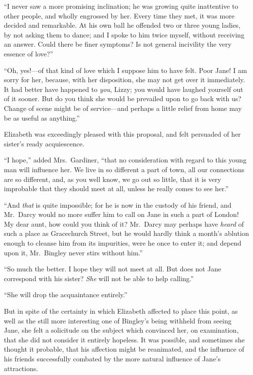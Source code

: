 \documentclass[12pt,english]{book}
\begin{document}
{}``I never saw a more promising inclination; he was growing quite
inattentive to other people, and wholly engrossed by her. Every time
they met, it was more decided and remarkable. At his own ball he offended
two or three young ladies, by not asking them to dance; and I spoke
to him twice myself, without receiving an answer. Could there be finer
symptoms? Is not general incivility the very essence of love?''\ 

{}``Oh, yes!\mbox{---}of that kind of love which I suppose him to
have felt. Poor Jane! I am sorry for her, because, with her disposition,
she may not get over it immediately. It had better have happened to
\textit{you}, Lizzy; you would have laughed yourself out of it sooner.
But do you think she would be prevailed upon to go back with us? Change
of scene might be of service\mbox{---}and perhaps a little relief
from home may be as useful as anything.''

Elizabeth was exceedingly pleased with this proposal, and felt persuaded
of her sister's ready acquiescence.

{}``I hope,'' added Mrs.\ Gardiner, {}``that no consideration
with regard to this young man will influence her. We live in so different
a part of town, all our connections are so different, and, as you
well know, we go out so little, that it is very improbable that they
should meet at all, unless he really comes to see her.''

{}``And \textit{that} is quite impossible; for he is now in the custody
of his friend, and Mr.\ Darcy would no more suffer him to call on
Jane in such a part of London! My dear aunt, how could you think of
it? Mr.\ Darcy may perhaps have \textit{heard} of such a place as
Gracechurch Street, but he would hardly think a month's ablution enough
to cleanse him from its impurities, were he once to enter it; and
depend upon it, Mr.\ Bingley never stirs without him.''

{}``So much the better. I hope they will not meet at all. But does
not Jane correspond with his sister? \textit{She} will not be able
to help calling.''

{}``She will drop the acquaintance entirely.''

But in spite of the certainty in which Elizabeth affected to place
this point, as well as the still more interesting one of Bingley's
being withheld from seeing Jane, she felt a solicitude on the subject
which convinced her, on examination, that she did not consider it
entirely hopeless. It was possible, and sometimes she thought it probable,
that his affection might be reanimated, and the influence of his friends
successfully combated by the more natural influence of Jane's attractions.
\end{document}
